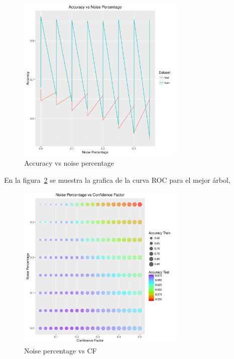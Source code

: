 \begin{figure}
  \centering
  \includegraphics[width = 8cm]{5c.pdf}
  \caption{Accuracy vs noise percentage}
  \label{fig:5c}
\end{figure}

En la figura~\ref{fig:5d} se muestra la grafica de la curva ROC para el mejor árbol,

\begin{figure}
  \centering
  \includegraphics[width = 8cm]{5d.pdf}
  \caption{Noise percentage vs CF}
  \label{fig:5d}
\end{figure}

